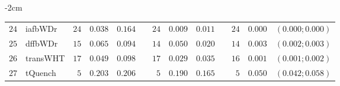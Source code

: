 \begin{table*}[!htbp]
\begin{adjustwidth*}{}{-2cm}
\begin{tabular}{@{}rlrrrrrrrrrcc@{}}
\footnotesize{$24$} & \footnotesize{iafbWDr  } & \footnotesize{$24$} & \footnotesize{$0.038$} & \footnotesize{$0.164$} && \footnotesize{$24$} & \footnotesize{$0.009$} & \footnotesize{$0.011$} && \footnotesize{$24$} & \footnotesize{$0.000$} & \footnotesize{$(0.000;0.000)$} \\
\footnotesize{$25$} & \footnotesize{dffbWDr  } & \footnotesize{$15$} & \footnotesize{$0.065$} & \footnotesize{$0.094$} && \footnotesize{$14$} & \footnotesize{$0.050$} & \footnotesize{$0.020$} && \footnotesize{$14$} & \footnotesize{$0.003$} & \footnotesize{$(0.002;0.003)$} \\
\footnotesize{$26$} & \footnotesize{transWHT } & \footnotesize{$17$} & \footnotesize{$0.049$} & \footnotesize{$0.098$} && \footnotesize{$17$} & \footnotesize{$0.029$} & \footnotesize{$0.035$} && \footnotesize{$16$} & \footnotesize{$0.001$} & \footnotesize{$(0.001;0.002)$} \\
\footnotesize{$27$} & \footnotesize{tQuench  } & \footnotesize{$5 $} & \footnotesize{$0.203$} & \footnotesize{$0.206$} && \footnotesize{$5 $} & \footnotesize{$0.190$} & \footnotesize{$0.165$} && \footnotesize{$5 $} & \footnotesize{$0.050$} & \footnotesize{$(0.042;0.058)$} \\
\bottomrule
\end{tabular}
\end{adjustwidth*}
\end{table*}

